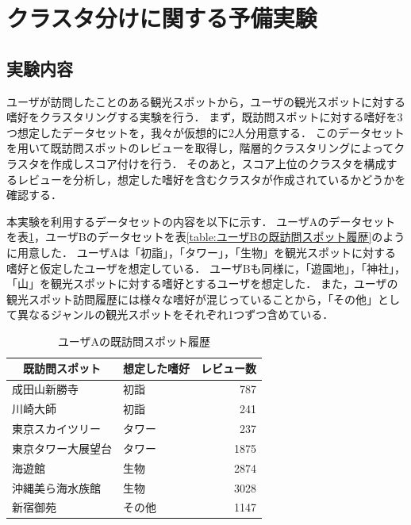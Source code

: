 \documentclass{deimj}
\begin{document}
\section{クラスタ分けに関する予備実験}
\subsection{実験内容}
ユーザが訪問したことのある観光スポットから，ユーザの観光スポットに対する嗜好をクラスタリングする実験を行う．
まず，既訪問スポットに対する嗜好を3つ想定したデータセットを，我々が仮想的に2人分用意する．
このデータセットを用いて既訪問スポットのレビューを取得し，階層的クラスタリングによってクラスタを作成しスコア付けを行う．
そのあと，スコア上位のクラスタを構成するレビューを分析し，想定した嗜好を含むクラスタが作成されているかどうかを確認する．

本実験を利用するデータセットの内容を以下に示す．
ユーザAのデータセットを表\ref{table:ユーザAの既訪問スポット履歴}，ユーザBのデータセットを表\ref{table:ユーザBの既訪問スポット履歴}のように用意した．
ユーザAは「初詣」，「タワー」，「生物」を観光スポットに対する嗜好と仮定したユーザを想定している．
ユーザBも同様に，「遊園地」，「神社」，「山」を観光スポットに対する嗜好とするユーザを想定した．
また，ユーザの観光スポット訪問履歴には様々な嗜好が混じっていることから，「その他」として異なるジャンルの観光スポットをそれぞれ1つずつ含めている．

\begin{table}[t]
    \caption{ユーザAの既訪問スポット履歴}
    \label{table:ユーザAの既訪問スポット履歴}
    \centering
    \begin{tabular}{l|l|r}
    \hline
    \multicolumn{1}{c|}{既訪問スポット} & \multicolumn{1}{c|}{想定した嗜好} & \multicolumn{1}{c}{レビュー数} \\ \hline
    成田山新勝寺                       & 初詣                          & 787                       \\
    川崎大師                         & 初詣                          & 241                       \\
    東京スカイツリー                     & タワー                         & 237                       \\
    東京タワー大展望台                    & タワー                         & 1875                      \\
    海遊館                          & 生物                          & 2874                      \\
    沖縄美ら海水族館                     & 生物                          & 3028                      \\
    新宿御苑                         & その他                         & 1147                      \\ \hline
    \end{tabular}
\end{table}
\end{document}
